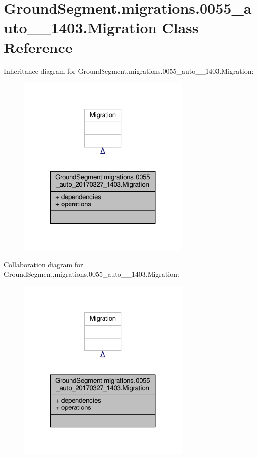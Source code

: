 \hypertarget{class_ground_segment_1_1migrations_1_10055__auto__20170327__1403_1_1_migration}{}\section{Ground\+Segment.\+migrations.0055\+\_\+auto\+\_\+\_\+1403.Migration Class Reference}
\label{class_ground_segment_1_1migrations_1_10055__auto__20170327__1403_1_1_migration}


Inheritance diagram for Ground\+Segment.\+migrations.0055\+\_\+auto\+\_\+\_\+1403.Migration\+:\nopagebreak
\begin{figure}[H]
\begin{center}
\leavevmode
\includegraphics[width=239pt]{class_ground_segment_1_1migrations_1_10055__auto__20170327__1403_1_1_migration__inherit__graph}
\end{center}
\end{figure}


Collaboration diagram for Ground\+Segment.\+migrations.0055\+\_\+auto\+\_\+\_\+1403.Migration\+:\nopagebreak
\begin{figure}[H]
\begin{center}
\leavevmode
\includegraphics[width=239pt]{class_ground_segment_1_1migrations_1_10055__auto__20170327__1403_1_1_migration__coll__graph}
\end{center}
\end{figure}
